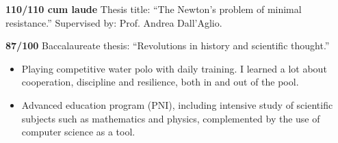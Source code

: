 	\divider

	\textbf{110/110 cum laude} Thesis title: ``The Newton's problem of minimal resistance.'' Supervised by: Prof. Andrea Dall'Aglio. \\
	\medskip
	\cvtag{\LaTeX}

	\divider

	\textbf{87/100} Baccalaureate thesis: ``Revolutions in history and scientific thought.''
	\medskip\
	\begin{itemize}
		\item Playing competitive water polo with daily training. I learned a lot about cooperation, discipline and resilience, both in and out of the pool.
		\item Advanced education program (PNI), including intensive study of scientific subjects such as mathematics and physics, complemented by the use of computer science as a tool.
	\end{itemize}

	\bigskip

